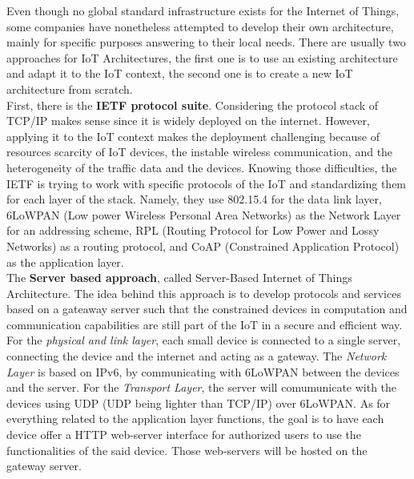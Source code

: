 Even though no global standard infrastructure exists for the Internet of Things, some companies have nonetheless attempted to develop their own architecture, mainly for specific purposes answering to their local needs. There are usually two approaches for IoT Architectures, the first one is to use an existing architecture and adapt it to the IoT context, the second one is to create a new IoT architecture from scratch.\\

First, there is the \textbf{IETF protocol suite}. Considering the protocol stack of TCP/IP makes sense since it is widely deployed on the internet. However, applying it to the IoT context makes the deployment challenging because of resources scarcity of IoT devices, the instable wireless communication, and the heterogeneity of the traffic data and the devices. Knowing those difficulties, the IETF is trying to work with specific protocols of the IoT and standardizing them  for each layer of the stack. Namely, they use 802.15.4 \cite{molisch2004ieee} for the data link layer, 6LoWPAN \cite{montenegro2007transmission} (Low power Wireless Personal Area Networks) as the Network Layer for an addressing scheme, RPL \cite{winter2012rpl} (Routing Protocol for Low Power and Lossy Networks) as a routing protocol, and CoAP \cite{shelby2014constrained} (Constrained Application Protocol) as the application layer.\\

The \textbf{Server based approach}, called Server-Based Internet of Things Architecture. The idea behind this approach is to develop protocols and services based on a gateaway server such that the constrained devices in computation and communication capabilities are still part of the IoT in a secure and efficient way. For the \textit{physical and link layer}, each small device is connected to a single server, connecting the device and the internet and acting as a gateway. The \textit{Network Layer} is based on IPv6, by communicating with 6LoWPAN between the devices and the server. For the \textit{Transport Layer}, the server will comumunicate with the devices using UDP (UDP being lighter than TCP/IP) over 6LoWPAN. As for everything related to the application layer functions, the goal is to have each device offer a HTTP web-server interface for authorized users to use the functionalities of the said device. Those web-servers will be hosted on the gateway server.\\

